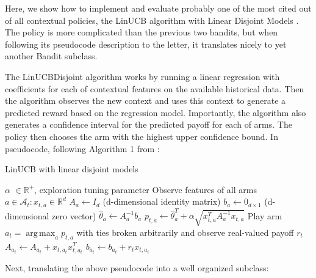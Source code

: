 \documentclass{jss}\usepackage[]{graphicx}\usepackage[]{color}
\DeclareMathOperator*{\argmax}{arg\,max}
\begin{document}
Here, we show how to implement and evaluate probably one of the most cited out of all contextual policies, the LinUCB algorithm with Linear Disjoint Models \cite{Li2010}. The policy is more complicated than the previous two bandits, but when following its pseudocode description to the letter, it translates nicely to yet another Bandit subclass.

The LinUCBDisjoint algorithm works by running a linear regression with coefficients for each of  contextual features on the available historical data. Then the algorithm observes the new context and uses this context to generate a predicted reward based on the regression model. Importantly, the algorithm also generates a confidence interval for the predicted payoff for each of  arms. The policy then chooses the arm with the highest upper confidence bound. In pseudocode, following Algorithm 1 from \cite{Li2010}:

\begin{algorithm}[H]
\caption{LinUCB with linear disjoint models}
\label{Alg:LinUCBDisjoint}
\begin{algorithmic}
\REQUIRE $\alpha$ \(  \in \mathbb{R}^{+} \), exploration tuning parameter
          \STATE Observe features of all arms \(  a \in \mathcal{A}_{t}: x_{t,a} \in \mathbb{R}^{d}\)
		      \STATE \(A_{a} \leftarrow I_{d}  \)  (d-dimensional identity matrix)
		      \STATE \(b_{a} \leftarrow 0_{d\times1}   \) (d-dimensional zero vector)
		\ENDIF
		\STATE \( \hat{\theta}_{a} \leftarrow A_{a}^{-1}b_{a} \)
		\STATE \( p_{t,a} \leftarrow \hat{\theta}_{a}^{T} + \alpha  \sqrt{ x_{t,a}^{T} A_{a}^{-1}x_{t,a}} \)
	\ENDFOR
	\STATE Play arm \(a_t = \argmax_a  p_{t,a}  \) with ties broken arbitrarily and observe real-valued payoff $r_t$
           \STATE \( A_{a_{t}} \leftarrow A_{a_{t}}+ x_{t,a_{t}}x_{t,a_{t}}^{T} \)
           \STATE  \( b_{a_{t}} \leftarrow b_{a_{t}}+ r_{t}x_{t,a_{t}}  \)
\ENDFOR
\end{algorithmic}
\end{algorithm}

Next, translating the above pseudocode into a well organized  subclass:
\end{document}
